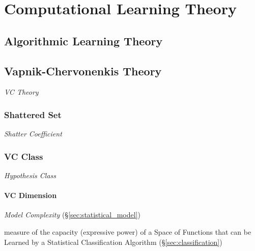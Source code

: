 \section{Computational Learning Theory}\label{sec:computational_learning_theory}




\subsection{Algorithmic Learning Theory}\label{sec:algorithmic_learning}

\subsection{Vapnik-Chervonenkis Theory}\label{sec:vc_theory}

\emph{VC Theory}



\subsubsection{Shattered Set}\label{sec:shattered_set}

\emph{Shatter Coefficient}



\subsubsection{VC Class}\label{sec:vc_class}

\emph{Hypothesis Class}



\paragraph{VC Dimension}\label{sec:vc_dimension}\hfill

\emph{Model Complexity} (\S\ref{sec:statistical_model})

measure of the capacity (expressive power) of a Space of Functions that can be
Learned by a Statistical Classification Algorithm (\S\ref{sec:classification})

